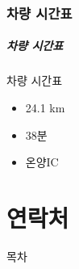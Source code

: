 \documentclass[aspectratio=1610,20pt,xcolor=pdftex,dvipsnames,table,handout]{beamer}
\begin{document}
		\section{차량 시간표}
		\begin{frame} [t,plain]
		\frametitle{차량 시간표}
			\begin{block} {차량 시간표}
			\setlength{\leftmargini}{2em}			
			\begin{itemize}
				\item 24.1 km
				\item  38분
				\item 온양IC
			\end{itemize}
			\end{block}						
		\end{frame}						

		\begin{frame} [t,plain]
		\end{frame}						
		\begin{frame} [t,plain]
		\end{frame}						


		\part{연락처}
		\frame{\partpage}

\label{part2} 	%

		
		\begin{frame} [plain]{목차}
		\tableofcontents%
		\end{frame}


		\begin{frame} [t,plain]
		\end{frame}						
		\begin{frame} [t,plain]
		\end{frame}						


\end{document}
